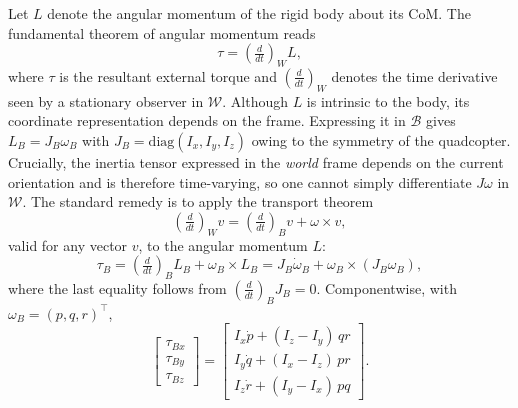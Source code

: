 \documentclass[11pt,a4paper]{article}
\theoremstyle{remark}
\numberwithin{equation}{section}
\begin{document}
Let $L$ denote the angular momentum of the rigid body about its CoM. The fundamental
theorem of angular momentum reads
\begin{equation}
\tau = \left(\tfrac{d}{dt}\right)_{\!W} L,
\label{eq:fundamental_momentum}
\end{equation}
where $\tau$ is the resultant external torque and $\left(\tfrac{d}{dt}\right)_{W}$ denotes
the time derivative seen by a stationary observer in $\mathcal{W}$. Although $L$ is intrinsic
to the body, its coordinate representation depends on the frame. Expressing it in
$\mathcal{B}$ gives $L_B = J_B \omega_B$ with $J_B = \mathrm{diag}(I_x, I_y, I_z)$ owing to
the symmetry of the quadcopter. Crucially, the inertia tensor expressed in the \emph{world}
frame depends on the current orientation and is therefore time-varying, so one cannot simply
differentiate $J \omega$ in $\mathcal{W}$. The standard remedy is to apply the
transport theorem
\begin{equation}
\left(\tfrac{d}{dt}\right)_{\!W} v = \left(\tfrac{d}{dt}\right)_{\!B} v + \omega \times v,
\end{equation}
valid for any vector $v$, to the angular momentum $L$:
\begin{equation}
\tau_B = \left(\tfrac{d}{dt}\right)_{\!B} L_B + \omega_B \times L_B
       = J_B \dot{\omega}_B + \omega_B \times (J_B \omega_B),
\label{eq:euler_body}
\end{equation}
where the last equality follows from $\left(\tfrac{d}{dt}\right)_{\!B} J_B = 0$. Componentwise,
with $\omega_B = (p, q, r)^\top$,
\begin{equation}
\begin{bmatrix} \tau_{Bx} \\ \tau_{By} \\ \tau_{Bz} \end{bmatrix}
=
\begin{bmatrix} I_x \dot{p} + (I_z - I_y)\, q r \\
                I_y \dot{q} + (I_x - I_z)\, p r \\
                I_z \dot{r} + (I_y - I_x)\, p q \end{bmatrix}.
\label{eq:euler_components}
\end{equation}
\end{document}

